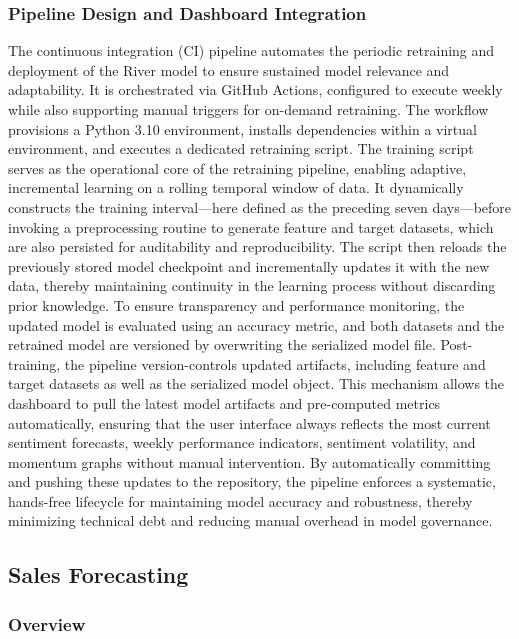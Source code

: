 \documentclass[pdflatex,sn-mathphys-num]{sn-jnl}%
\begin{document}
\subsubsection{Pipeline Design and Dashboard Integration}
The continuous integration (CI) pipeline automates the periodic retraining and deployment of the River model to ensure sustained model relevance and adaptability. It is orchestrated via GitHub Actions, configured to execute weekly while also supporting manual triggers for on-demand retraining. The workflow provisions a Python 3.10 environment, installs dependencies within a virtual environment, and executes a dedicated retraining script.
The training script serves as the operational core of the retraining pipeline, enabling adaptive, incremental learning on a rolling temporal window of data. It dynamically constructs the training interval—here defined as the preceding seven days—before invoking a preprocessing routine to generate feature and target datasets, which are also persisted for auditability and reproducibility. The script then reloads the previously stored model checkpoint and incrementally updates it with the new data, thereby maintaining continuity in the learning process without discarding prior knowledge. To ensure transparency and performance monitoring, the updated model is evaluated using an accuracy metric, and both datasets and the retrained model are versioned by overwriting the serialized model file.
Post-training, the pipeline version-controls updated artifacts, including feature and target datasets as well as the serialized model object. This mechanism allows the dashboard to pull the latest model artifacts and pre-computed metrics automatically, ensuring that the user interface always reflects the most current sentiment forecasts, weekly performance indicators, sentiment volatility, and momentum graphs without manual intervention. By automatically committing and pushing these updates to the repository, the pipeline enforces a systematic, hands-free lifecycle for maintaining model accuracy and robustness, thereby minimizing technical debt and reducing manual overhead in model governance.

\subsection{Sales Forecasting}\label{sec:demand_forecasting}

\subsubsection{Overview}
\end{document}
